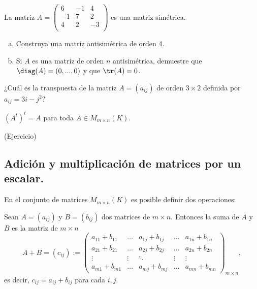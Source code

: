\begin{ejem}
    La matriz $A=\begin{pmatrix}
    6 & -1 & 4\\
    -1 & 7 & 2\\
    4& 2 & -3\\
    \end{pmatrix}$ es una matriz simétrica.
\end{ejem}
\begin{ejer}
\begin{enumerate}[(a)]
\item Construya una matriz antisimétrica de orden 4.
\item Si $A$ es una matriz de orden $n$ antisimétrica, demuestre que $ \diag(A)=(0,...,0)$ y que
$\tr(A)=0$. 
\end{enumerate}
\end{ejer}

\begin{ejer}
¿Cuál es la transpuesta de la matriz $A = (a_{ij})$ de orden $3 \times 2$ definida por $a_{i j} = 3i-j^2?$
\end{ejer}

\begin{prop}\label{traspuesta}
$(A^t)^t=A$ para toda $A\in M_{m\times n}(K)$.
\end{prop}
\proof (Ejercicio)



\subsection{Adici\'on y multiplicaci\'on de matrices por un escalar.}
En el conjunto de matrices $M_{m\times n}(K)$ es posible definir dos operaciones:
\begin{defin}
Sean $A = (a_{ij})$ y $B = (b_{ij})$ dos matrices de $m \times n$. Entonces la suma
de $A$ y $B$ es la matriz de $m \times n$
\[A+B=(c_{ij}):=\left(\begin{array}{ccccc}
     a_{11}+b_{11} & \dots & a_{1j}+b_{1j} &\dots & a_{1n}+b_{1n}\\
     a_{21}+b_{21} & \dots &a_{2j}+b_{2j} &\dots & a_{2n}+b_{2n}\\
     \vdots&  \vdots & \ddots &  \vdots &\vdots \\
     a_{m1}+b_{m1} & \dots & a_{mj}+b_{mj} &\dots & a_{mn}+b_{mn}
\end{array}\right)_{m\times n},\]
es decir, $c_{ij}=a_{ij}+b_{ij}$ para cada $i,j$.
\end{defin}

